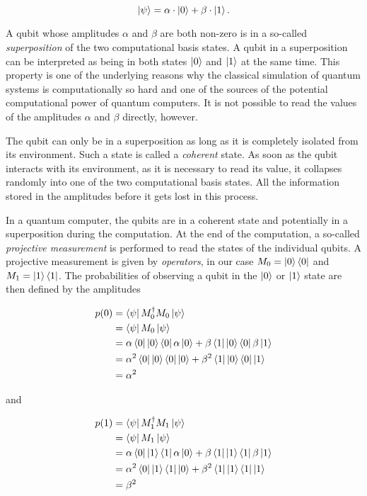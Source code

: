 \begin{equation}
  \Ket{\psi} = \alpha \cdot \Ket{0} + \beta \cdot \Ket{1}.
\end{equation}

A qubit whose amplitudes $\alpha$ and $\beta$ are both non-zero is in a so-called \textit{superposition} of the two
computational basis states. A qubit in a superposition can be interpreted as being in both states $\Ket{0}$ and $\Ket{1}$ at the same time.
This property is one of the underlying reasons why the classical simulation of
quantum systems is computationally so hard and one of the sources of the potential computational power of quantum computers.
It is not possible to read the values of the amplitudes $\alpha$ and $\beta$
directly, however.

The qubit can only be in a superposition as long as it is completely isolated
from its environment. Such a state is called a \textit{coherent} state. As
soon as the qubit interacts with its environment, as it is necessary to read
its value, it collapses randomly into one of the two computational basis
states. All the information stored in the amplitudes before it gets lost in this process.

In a quantum computer, the qubits are in a coherent state and potentially in a superposition during the computation. At the end of the computation, a so-called
\textit{projective measurement} is performed to read the states of the individual qubits. A projective measurement is given
by \textit{operators}, in our case $M_0 = \Ket{0}\Bra{0}$ and $M_1 = \Ket{1}\Bra{1}$. The probabilities of observing a qubit in the $\Ket{0}$ or
$\Ket{1}$ state are then defined by the amplitudes

\begin{align}
  p(0) &= \Bra{\psi} M_0^{\dagger}M_0 \Ket{\psi} \\
       &=  \Bra{\psi} M_0 \Ket{\psi} \\
       &= \alpha \Bra{0} \Ket{0} \Bra{0} \alpha \Ket{0} + \beta \Bra{1} \Ket{0} \Bra{0} \beta \Ket{1} \\
       &= \alpha^2 \Bra{0} \Ket{0} \Bra{0} \Ket{0} + \beta^2 \Bra{1} \Ket{0} \Bra{0} \Ket{1} \\
       &= \alpha^2
\end{align}

and

\begin{align}
  p(1) &= \Bra{\psi} M_1^{\dagger} M_1 \Ket{\psi} \\
       &= \Bra{\psi} M_1 \Ket{\psi} \\
       &= \alpha \Bra{0} \Ket{1} \Bra{1} \alpha \Ket{0} + \beta \Bra{1} \Ket{1} \Bra{1} \beta \Ket{1} \\
       &= \alpha^2 \Bra{0} \Ket{1} \Bra{1} \Ket{0} + \beta^2 \Bra{1} \Ket{1} \Bra{1} \Ket{1} \\
       &= \beta^2
\end{align}

